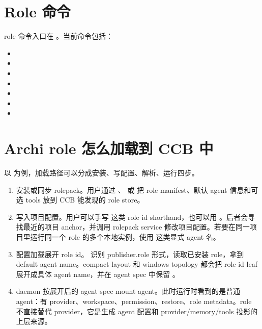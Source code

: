 \section{Role 命令}

role 命令入口在 。当前命令包括：

\begin{itemize}
  \item {}
  \item {}
  \item {}
  \item {}
  \item {}
  \item {}
  \item {}
\end{itemize}

\section{Archi role 怎么加载到 CCB 中}

以  为例，加载路径可以分成安装、写配置、解析、运行四步。

\begin{enumerate}
  \item 安装或同步 rolepack。用户通过 、 或  把 role manifest、默认 agent 信息和可选 tools 放到 CCB 能发现的 role store。
  \item 写入项目配置。用户可以手写  这类 role id shorthand，也可以用 。后者会寻找最近的项目  anchor，并调用 rolepack service 修改项目配置。若要在同一项目里运行同一个 role 的多个本地实例，使用  这类显式 agent 名。
  \item 配置加载展开 role id。 识别 publisher.role 形式，读取已安装 role，拿到 default agent name。compact layout 和 windows topology 都会把 role id leaf 展开成具体 agent name，并在 agent spec 中保留 。
  \item daemon 按展开后的 agent spec mount agent。此时运行时看到的是普通 agent：有 provider、workspace、permission、restore、role metadata。role 不直接替代 provider，它是生成 agent 配置和 provider/memory/tools 投影的上层来源。
\end{enumerate}

